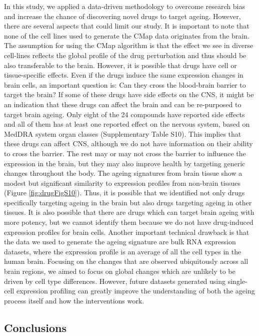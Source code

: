 \documentclass[12pt,twoside]{unicam}
\begin{document}
In this study, we applied a data-driven methodology to overcome research bias and increase the chance of discovering novel drugs to target ageing. However, there are several aspects that could limit our study. It is important to note that none of the cell lines used to generate the CMap data originates from the brain. The assumption for using the CMap algorithm is that the effect we see in diverse cell-lines reflects the global profile of the drug perturbation and thus should be also transferable to the brain. However, it is possible that drugs have cell or tissue-specific effects. Even if the drugs induce the same expression changes in brain cells, an important question is: Can they cross the blood-brain barrier to target the brain? If some of these drugs have side effects on the CNS, it might be an indication that these drugs can affect the brain and can be re-purposed to target brain ageing. Only eight of the 24 compounds have reported side effects and all of them has at least one reported effect on the nervous system, based on MedDRA system organ classes (Supplementary Table S10). This implies that these drugs can affect CNS, although we do not have information on their ability to cross the barrier. The rest may or may not cross the barrier to influence the expression in the brain, but they may also improve health by targeting generic changes throughout the body. The ageing signatures from brain tissue show a modest but significant similarity to expression profiles from non-brain tissues (Figure \ref{fig:drugFigS10}). Thus, it is possible that we identified not only drugs specifically targeting ageing in the brain but also drugs targeting ageing in other tissues. It is also possible that there are drugs which can target brain ageing with more potency, but we cannot identify them because we do not have drug-induced expression profiles for brain cells. Another important technical drawback is that the data we used to generate the ageing signature are bulk RNA expression datasets, where the expression profile is an average of all the cell types in the human brain. Focusing on the changes that are observed ubiquitously across all brain regions, we aimed to focus on global changes which are unlikely to be driven by cell type differences. However, future datasets generated using single-cell expression profiling can greatly improve the understanding of both the ageing process itself and how the interventions work.

\hypertarget{conclusions}{%
\subsection{Conclusions}\label{conclusions}}
\end{document}
